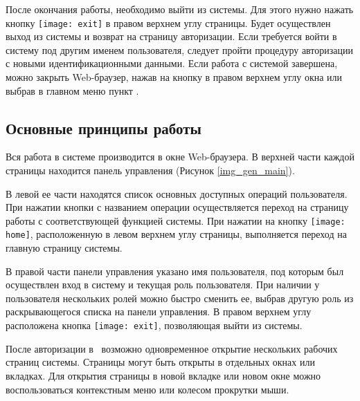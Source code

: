 После окончания работы, необходимо выйти из системы. Для этого нужно нажать кнопку \texttt{[image: exit]} в правом верхнем углу страницы. Будет осуществлен выход из системы и возврат на страницу авторизации. Если требуется войти в систему под другим именем пользователя, следует пройти процедуру авторизации с новыми идентификационными данными. Если работа с системой завершена, можно закрыть Web-браузер, нажав на кнопку  в правом верхнем углу окна или выбрав в главном меню пункт .

\subsection{Основные принципы работы}

Вся работа в системе производится в окне Web-браузера. В верхней части каждой страницы находится панель управления (Рисунок \ref{img_gen_main}).

В левой ее части находятся список основных доступных операций пользователя. При нажатии кнопки с названием операции осуществляется переход на страницу работы с соответствующей функцией системы. При нажатии на кнопку \texttt{[image: home]}, расположенную в левом верхнем углу страницы, выполняется переход на главную страницу системы.

В правой части панели управления указано имя пользователя, под которым был осуществлен вход в систему и текущая роль пользователя. При наличии у пользователя нескольких ролей можно быстро сменить ее, выбрав другую роль из раскрывающегося списка на панели управления. В правом верхнем углу расположена кнопка \texttt{[image: exit]}, позволяющая выйти из системы.

\begin{prim}
 После авторизации в \tmis~возможно одновременное открытие нескольких рабочих страниц системы. Страницы могут быть открыты в отдельных окнах или вкладках. Для открытия страницы в новой вкладке или новом окне можно воспользоваться контекстным меню или колесом прокрутки мыши.
\end{prim}


